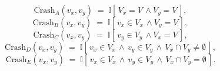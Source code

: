 \documentclass[conference]{IEEEtran}
\begin{document}
\begin{equation}
\mathrm{Crash}_A(v_x,v_y) \;=\; \mathbb{I}\!\left[\,V_x = V\, \wedge V_y = V \,\right],
\tag{A}
\end{equation}
\begin{equation}
\mathrm{Crash}_B(v_x,v_y) \;=\; \mathbb{I}\!\left[\,v_x\in V_x\, \wedge V_y = V \,\right],
\tag{B}
\end{equation}
\begin{equation}
\mathrm{Crash}_C(v_x,v_y) \;=\; \mathbb{I}\!\left[\,v_y\in V_y\, \wedge V_x = V \,\right],
\tag{C}
\end{equation}
\begin{equation}
\mathrm{Crash}_D(v_x,v_y) \;=\; \mathbb{I}\!\left[\,v_x\in V_x \,\wedge\, v_y\in V_y \,\wedge\, V_x \cap V_y \neq \emptyset \,\right],
\tag{D}
\end{equation}
\begin{equation}
\mathrm{Crash}_E(v_x,v_y) \;=\; \mathbb{I}\!\left[\,v_x\in V_x \,\wedge\, v_y\in V_y \,\wedge\, V_x \cap V_y = \emptyset \,\right].
\tag{E}
\end{equation}


\end{document}

